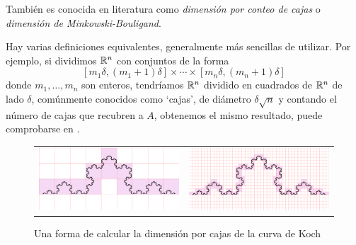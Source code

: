 También es conocida en literatura como \textit{dimensión por conteo de cajas} o \textit{dimensión de Minkowski-Bouligand}.

Hay varias definiciones equivalentes, generalmente más sencillas de utilizar. Por ejemplo, si dividimos $\mathbb{R}^n$ con conjuntos de la forma
$$
[m_1 \delta, (m_1+1)\delta]\times\cdots\times[m_n \delta, (m_n+1)\delta]
$$
donde $m_1,\dots,m_n$ son enteros, tendríamos $\mathbb{R}^n$ dividido en cuadrados de $\mathbb{R}^n$ de lado $\delta$, comúnmente conocidos como `cajas', de diámetro $\delta\sqrt{n}$ y contando el número de cajas que recubren a $A$, obtenemos el mismo resultado, puede comprobarse en \cite[sección 3.1]{alma991007022459704990}.

\begin{figure}[ht]
\begin{tabular}{cc}
\includegraphics[scale=0.17]{./img/cajas-grandes.png} &   \includegraphics[scale=0.17]{./img/cajas-peques.png} \\
\end{tabular}
\caption{Una forma de calcular la dimensión por cajas de la curva de Koch}
\label{fig:dim-cajas}
\end{figure}

